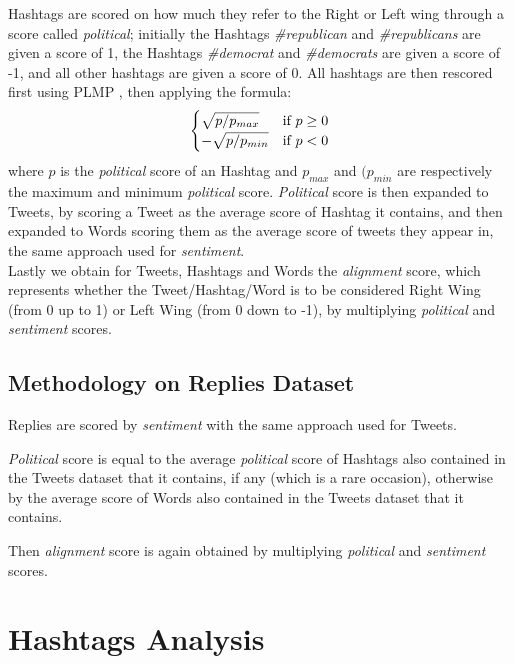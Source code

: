 \documentclass[twoside,twocolumn]{article}
\begin{document}
	Hashtags are scored on how much they refer to the Right or Left wing through a score called \textit{political}; initially the Hashtags \textit{\#republican} and \textit{\#republicans} are given a score of 1, the Hashtags \textit{\#democrat} and \textit{\#democrats} are given a score of -1, and all other hashtags are given a score of 0. All hashtags are then rescored first using PLMP \cite{PLMP}, then applying the formula: 
	\begin{equation*}
		\begin{cases}
			\sqrt{p/p_{max}} & \text{if $ p \geq 0 $}\\
			-\sqrt{p/p_{min}} & \text{if $ p < 0 $}
		\end{cases}       
	\end{equation*} 
	where $ p $ is the \textit{political} score of an Hashtag and $ p_{max} $ and $ (p_{min} $ are respectively the maximum and minimum \textit{political} score.
	\textit{Political} score is then expanded to Tweets, by scoring a Tweet as the average score of Hashtag it contains, and then expanded to Words scoring them as the average score of tweets they appear in, the same approach used for \textit{sentiment}.\\
	
	Lastly we obtain for Tweets, Hashtags and Words the \textit{alignment} score, which represents whether the Tweet/Hashtag/Word is to be considered Right Wing (from 0 up to 1) or Left Wing (from 0 down to -1), by multiplying \textit{political} and \textit{sentiment} scores.
	
	\subsection{Methodology on Replies Dataset}
	Replies are scored by \textit{sentiment} with the same approach used for Tweets.
	
	\textit{Political} score is equal to the average \textit{political} score of Hashtags also contained in the Tweets dataset that it contains, if any (which is a rare occasion), otherwise by the average score of Words also contained in the Tweets dataset that it contains.
	
	Then \textit{alignment} score is again obtained by multiplying \textit{political} and \textit{sentiment} scores.
	
	
	\section{Hashtags Analysis}
\end{document}
